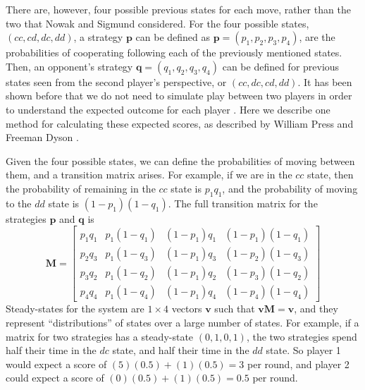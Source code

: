 \documentclass{article}
\renewcommand{\vec}[1]{\mathbf{#1}}
\begin{document}
There are, however, four possible previous states for each move, rather than the two that Nowak and Sigmund considered. For the four possible states, \((cc, cd, dc, dd)\), a strategy \(\vec{p}\) can be defined as \(\vec{p} = (p_1, p_2, p_3, p_4)\), are the probabilities of cooperating following each of the previously mentioned states. Then, an opponent's strategy \(\vec{q} = (q_1, q_2, q_3, q_4)\) can be defined for previous states seen from the second player's perspective, or \((cc, dc, cd, dd)\). It has been shown before that we do not need to simulate play between two players in order to understand the expected outcome for each player \cite{hauert_effects_1997}. Here we describe one method for calculating these expected scores, as described by William Press and Freeman Dyson \cite{press_iterated_2012}.

Given the four possible states, we can define the probabilities of moving between them, and a transition matrix arises. For example, if we are in the \(cc\) state, then the probability of remaining in the \(cc\) state is \(p_1 q_1\), and the probability of moving to the \(dd\) state is \((1 - p_1)(1 - q_1)\). The full transition matrix for the strategies \(\vec{p}\) and \(\vec{q}\) is
    \[ \mathbf{M} =  \begin{bmatrix}
            p_1 q_1 & p_1 (1 - q_1) & (1 - p_1) q_1 & (1 - p_1)(1 - q_1) \\
            p_2 q_3 & p_1 (1 - q_3) & (1 - p_1) q_3 & (1 - p_2)(1 - q_3) \\
            p_3 q_2 & p_1 (1 - q_2) & (1 - p_1) q_2 & (1 - p_3)(1 - q_2) \\
            p_4 q_4 & p_1 (1 - q_4) & (1 - p_1) q_4 & (1 - p_4)(1 - q_4) 
            \end{bmatrix} \]
Steady-states for the system are \(1 \times 4\) vectors \(\vec{v}\) such that \(\vec{v} \mathbf{M} = \vec{v}\), and they represent ``distributions'' of states over a large number of states. For example, if a matrix for two strategies has a steady-state \((0, 1, 0, 1)\), the two strategies spend half their time in the \(dc\) state, and half their time in the \(dd\) state. So player 1 would expect a score of \((5)(0.5) + (1)(0.5) = 3\) per round, and player 2 could expect a score of \((0)(0.5) + (1)(0.5) = 0.5\) per round.
\end{document}
